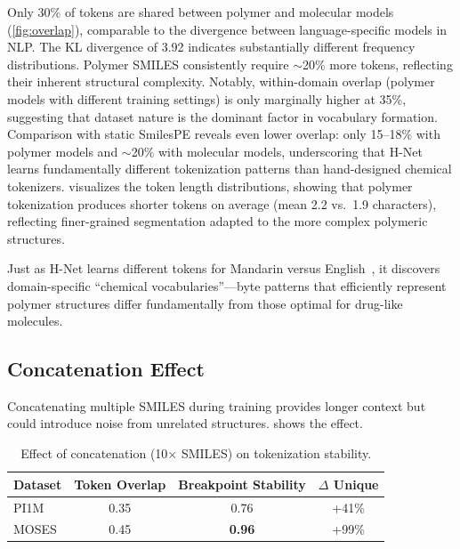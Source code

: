 \documentclass{article}
\newcommand{\hnet}{H-Net}
\newcommand{\smilespe}{SmilesPE}
\begin{document}
Only 30\% of tokens are shared between polymer and molecular models (\cref{fig:overlap}), comparable to the divergence between language-specific models in NLP. The KL divergence of 3.92 indicates substantially different frequency distributions. Polymer SMILES consistently require $\sim$20\% more tokens, reflecting their inherent structural complexity. Notably, within-domain overlap (polymer models with different training settings) is only marginally higher at 35\%, suggesting that dataset nature is the dominant factor in vocabulary formation. Comparison with static \smilespe{} reveals even lower overlap: only 15--18\% with polymer models and $\sim$20\% with molecular models, underscoring that \hnet{} learns fundamentally different tokenization patterns than hand-designed chemical tokenizers.  visualizes the token length distributions, showing that polymer tokenization produces shorter tokens on average (mean 2.2 vs.\ 1.9 characters), reflecting finer-grained segmentation adapted to the more complex polymeric structures.

Just as \hnet{} learns different tokens for Mandarin versus English~\citep{hwang2025hnet}, it discovers domain-specific ``chemical vocabularies''---byte patterns that efficiently represent polymer structures differ fundamentally from those optimal for drug-like molecules.

\subsection{Concatenation Effect}

Concatenating multiple SMILES during training provides longer context but could introduce noise from unrelated structures.  shows the effect.

\begin{table}[t]
\caption{Effect of concatenation (10$\times$ SMILES) on tokenization stability.}
\label{tab:concat}
\vskip 0.1in
\begin{center}
\begin{small}
\begin{tabular}{lccc}
\toprule
Dataset & Token Overlap & Breakpoint Stability & $\Delta$ Unique \\
\midrule
PI1M & 0.35 & 0.76 & +41\% \\
MOSES & 0.45 & \textbf{0.96} & +99\% \\
\bottomrule
\end{tabular}
\end{small}
\end{center}
\vskip -0.1in
\end{table}
\end{document}
